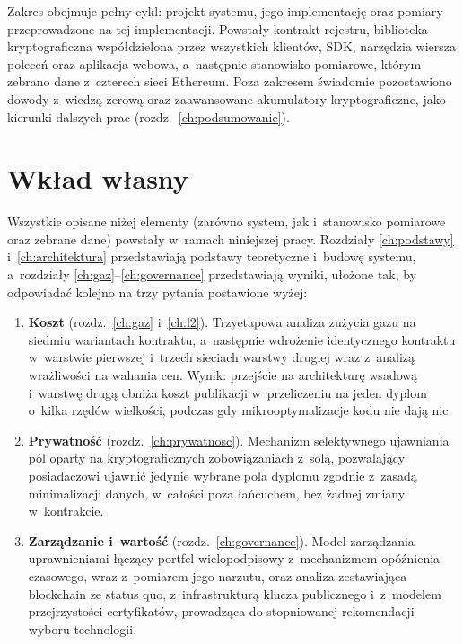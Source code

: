 Zakres obejmuje pełny cykl: projekt systemu, jego implementację oraz pomiary
przeprowadzone na tej implementacji. Powstały kontrakt rejestru, biblioteka
kryptograficzna współdzielona przez wszystkich klientów, SDK, narzędzia wiersza
poleceń oraz aplikacja webowa, a~następnie stanowisko pomiarowe, którym zebrano
dane z~czterech sieci Ethereum. Poza zakresem świadomie pozostawiono dowody
z~wiedzą zerową oraz zaawansowane akumulatory kryptograficzne, jako kierunki
dalszych prac (rozdz.~\ref{ch:podsumowanie}).

\section{Wkład własny}
\label{sec:wklad}

Wszystkie opisane niżej elementy (zarówno system, jak i~stanowisko pomiarowe
oraz zebrane dane) powstały w~ramach niniejszej pracy. Rozdziały
\ref{ch:podstawy} i~\ref{ch:architektura} przedstawiają podstawy teoretyczne
i~budowę systemu, a~rozdziały \ref{ch:gaz}--\ref{ch:governance} przedstawiają wyniki,
ułożone tak, by odpowiadać kolejno na trzy pytania postawione wyżej:

\begin{enumerate}
  \item \textbf{Koszt} (rozdz.~\ref{ch:gaz} i~\ref{ch:l2}). Trzyetapowa analiza
        zużycia gazu na siedmiu wariantach kontraktu, a~następnie wdrożenie
        identycznego kontraktu w~warstwie pierwszej i~trzech sieciach warstwy
        drugiej wraz z~analizą wrażliwości na wahania cen. Wynik: przejście na
        architekturę wsadową i~warstwę drugą obniża koszt publikacji
        w~przeliczeniu na jeden dyplom o~kilka rzędów wielkości, podczas gdy
        mikrooptymalizacje kodu nie dają nic.
  \item \textbf{Prywatność} (rozdz.~\ref{ch:prywatnosc}). Mechanizm selektywnego
        ujawniania pól oparty na kryptograficznych zobowiązaniach z~solą,
        pozwalający posiadaczowi ujawnić jedynie wybrane pola dyplomu zgodnie
        z~zasadą minimalizacji danych, w~całości poza łańcuchem, bez żadnej
        zmiany w~kontrakcie.
  \item \textbf{Zarządzanie i~wartość} (rozdz.~\ref{ch:governance}). Model zarządzania
        uprawnieniami łączący portfel wielopodpisowy z~mechanizmem opóźnienia
        czasowego, wraz z~pomiarem jego narzutu, oraz analiza zestawiająca
        blockchain ze status quo, z~infrastrukturą klucza publicznego
        i~z~modelem przejrzystości certyfikatów, prowadząca do stopniowanej
        rekomendacji wyboru technologii.
\end{enumerate}
